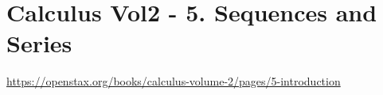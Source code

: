\section{Calculus Vol2 - 5. Sequences and Series}

\url{https://openstax.org/books/calculus-volume-2/pages/5-introduction}


\clearpage

\clearpage

\clearpage

\clearpage

\clearpage

\clearpage
